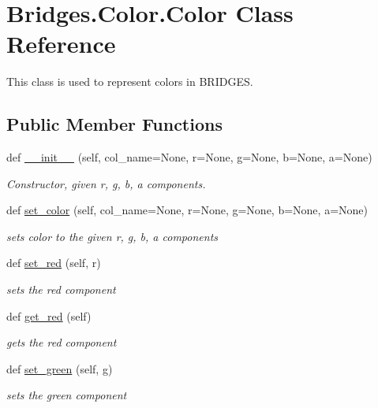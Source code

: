 \hypertarget{class_bridges_1_1_color_1_1_color}{}\section{Bridges.\+Color.\+Color Class Reference}
\label{class_bridges_1_1_color_1_1_color}


This class is used to represent colors in B\+R\+I\+D\+G\+ES.  


\subsection*{Public Member Functions}
\begin{DoxyCompactItemize}
\item 
def \mbox{\hyperlink{class_bridges_1_1_color_1_1_color_a7ce36ae885e399b739cd5ae5aa53a476}{\+\_\+\+\_\+init\+\_\+\+\_\+}} (self, col\+\_\+name=None, r=None, g=None, b=None, a=None)
\begin{DoxyCompactList}\small\item\em Constructor, given r, g, b, a components. \end{DoxyCompactList}\item 
def \mbox{\hyperlink{class_bridges_1_1_color_1_1_color_abb49cdb739a55e982a4080bfa761a701}{set\+\_\+color}} (self, col\+\_\+name=None, r=None, g=None, b=None, a=None)
\begin{DoxyCompactList}\small\item\em sets color to the given r, g, b, a components \end{DoxyCompactList}\item 
def \mbox{\hyperlink{class_bridges_1_1_color_1_1_color_a8e2c7504d49723b525e08d7518a5dcfd}{set\+\_\+red}} (self, r)
\begin{DoxyCompactList}\small\item\em sets the red component \end{DoxyCompactList}\item 
def \mbox{\hyperlink{class_bridges_1_1_color_1_1_color_a5bb6cb1066b378968cdb7e61acc3e350}{get\+\_\+red}} (self)
\begin{DoxyCompactList}\small\item\em gets the red component \end{DoxyCompactList}\item 
def \mbox{\hyperlink{class_bridges_1_1_color_1_1_color_a6aa178a4f074320fd1da522d446585b8}{set\+\_\+green}} (self, g)
\begin{DoxyCompactList}\small\item\em sets the green component \end{DoxyCompactList}\item 

\end{DoxyCompactItemize}
